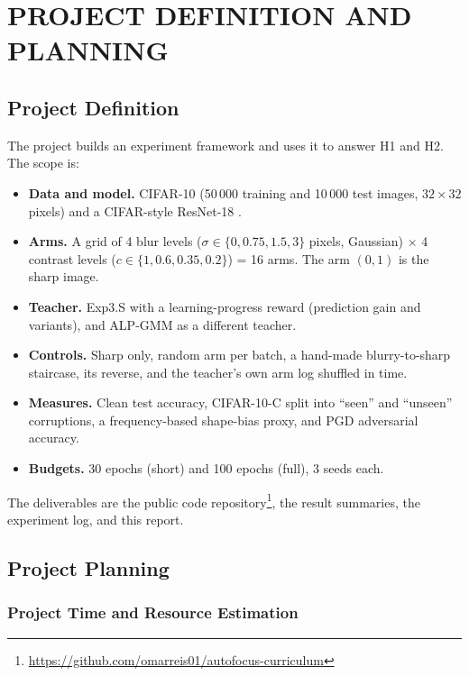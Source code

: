 \documentclass[a4paper,12pt]{report}
\begin{document}
\chapter{PROJECT DEFINITION AND PLANNING}

\section{Project Definition}

The project builds an experiment framework and uses it to answer H1 and H2. The scope is:
\begin{itemize}
\item \textbf{Data and model.} CIFAR-10 (50\,000 training and 10\,000 test images, $32\times32$ pixels) and a CIFAR-style ResNet-18 \cite{he2016resnet}.
\item \textbf{Arms.} A grid of 4 blur levels ($\sigma\in\{0, 0.75, 1.5, 3\}$ pixels, Gaussian) $\times$ 4 contrast levels ($c\in\{1, 0.6, 0.35, 0.2\}$) = 16 arms. The arm $(0,1)$ is the sharp image.
\item \textbf{Teacher.} Exp3.S \cite{graves2017,auer2002} with a learning-progress reward (prediction gain and variants), and ALP-GMM \cite{portelas2019} as a different teacher.
\item \textbf{Controls.} Sharp only, random arm per batch, a hand-made blurry-to-sharp staircase, its reverse, and the teacher's own arm log shuffled in time.
\item \textbf{Measures.} Clean test accuracy, CIFAR-10-C split into ``seen'' and ``unseen'' corruptions, a frequency-based shape-bias proxy, and PGD adversarial accuracy.
\item \textbf{Budgets.} 30 epochs (short) and 100 epochs (full), 3 seeds each.
\end{itemize}
The deliverables are the public code repository\footnote{\url{https://github.com/omarreis01/autofocus-curriculum}}, the result summaries, the experiment log, and this report.

\section{Project Planning}

\subsection{Project Time and Resource Estimation}
\end{document}

